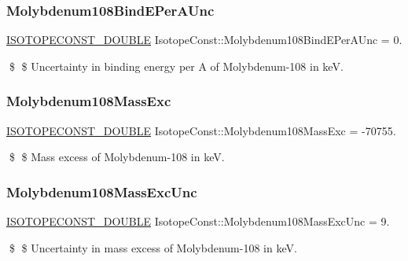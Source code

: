 \subsubsection{\texorpdfstring{Molybdenum108\+Bind\+E\+Per\+A\+Unc}{Molybdenum108BindEPerAUnc}}
{\footnotesize\ttfamily \mbox{\hyperlink{group___isotope_const-_macros_ga8f45a7272ce02c0b4c65c44636ed719a}{I\+S\+O\+T\+O\+P\+E\+C\+O\+N\+S\+T\+\_\+\+D\+O\+U\+B\+LE}} Isotope\+Const\+::\+Molybdenum108\+Bind\+E\+Per\+A\+Unc = 0.}

\$ \$ Uncertainty in binding energy per A of Molybdenum-\/108 in keV. \mbox{\label{group___isotope_const-_molybdenum-_mo108_ga459b37a93416fe0d8f5d07a21b317c91}} 
\subsubsection{\texorpdfstring{Molybdenum108\+Mass\+Exc}{Molybdenum108MassExc}}
{\footnotesize\ttfamily \mbox{\hyperlink{group___isotope_const-_macros_ga8f45a7272ce02c0b4c65c44636ed719a}{I\+S\+O\+T\+O\+P\+E\+C\+O\+N\+S\+T\+\_\+\+D\+O\+U\+B\+LE}} Isotope\+Const\+::\+Molybdenum108\+Mass\+Exc = -\/70755.}

\$ \$ Mass excess of Molybdenum-\/108 in keV. \mbox{\label{group___isotope_const-_molybdenum-_mo108_ga3b3971d04b40060cb8261c6fed556353}} 
\subsubsection{\texorpdfstring{Molybdenum108\+Mass\+Exc\+Unc}{Molybdenum108MassExcUnc}}
{\footnotesize\ttfamily \mbox{\hyperlink{group___isotope_const-_macros_ga8f45a7272ce02c0b4c65c44636ed719a}{I\+S\+O\+T\+O\+P\+E\+C\+O\+N\+S\+T\+\_\+\+D\+O\+U\+B\+LE}} Isotope\+Const\+::\+Molybdenum108\+Mass\+Exc\+Unc = 9.}

\$ \$ Uncertainty in mass excess of Molybdenum-\/108 in keV. \mbox{\label{group___isotope_const-_molybdenum-_mo108_ga7e59fb8c1f44f68a0ad56f3521dc47fd}} 
